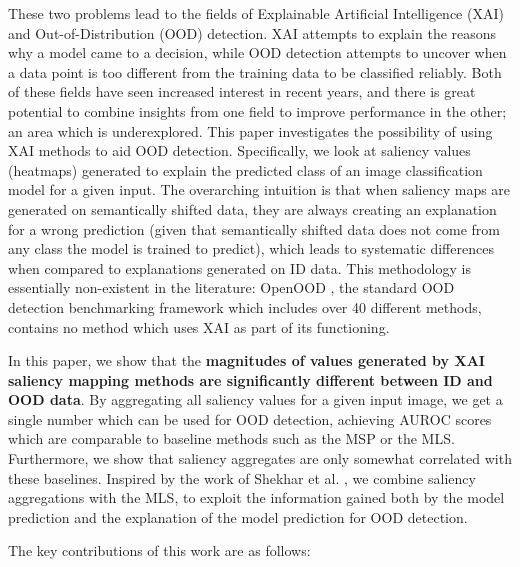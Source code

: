 \documentclass[runningheads]{llncs}
\begin{document}
These two problems lead to the fields of Explainable Artificial Intelligence (XAI) and Out-of-Distribution (OOD) detection. XAI attempts to explain the reasons why a model came to a decision, while OOD detection attempts to uncover when a data point is too different from the training data to be classified reliably. Both of these fields have seen increased interest in recent years, and there is great potential to combine insights from one field to improve performance in the other; an area which is underexplored. This paper investigates the possibility of using XAI methods to aid OOD detection. Specifically, we look at saliency values (heatmaps) generated to explain the predicted class of an image classification model for a given input. The overarching intuition is that when saliency maps are generated on semantically shifted data, they are always creating an explanation for a wrong prediction (given that semantically shifted data does not come from any class the model is trained to predict), which leads to systematic differences when compared to explanations generated on ID data. This methodology is essentially non-existent in the literature: OpenOOD \cite{openood, openood15}, the standard OOD detection benchmarking framework which includes over 40 different methods, contains no method which uses XAI as part of its functioning.

In this paper, we show that the \textbf{magnitudes of values generated by XAI saliency mapping methods are significantly different between ID and OOD data}. By aggregating all saliency values for a given input image, we get a single number which can be used for OOD detection, achieving AUROC scores which are comparable to baseline methods such as the MSP or the MLS. Furthermore, we show that saliency aggregates are only somewhat correlated with these baselines. Inspired by the work of Shekhar et al. \cite{combood}, we combine saliency aggregations with the MLS, to exploit the information gained both by the model prediction and the explanation of the model prediction for OOD detection.

The key contributions of this work are as follows:
\end{document}
